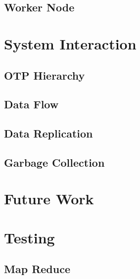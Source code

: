 \documentclass[a4paper,12pt]{article}
\begin{document}
\subsection{Worker Node}

\section{System Interaction}
\subsection{OTP Hierarchy}
\subsection{Data Flow}
\subsection{Data Replication}
\subsection{Garbage Collection}

\section{Future Work}

\section{Testing}
\subsection{Map Reduce}
\end{document}
